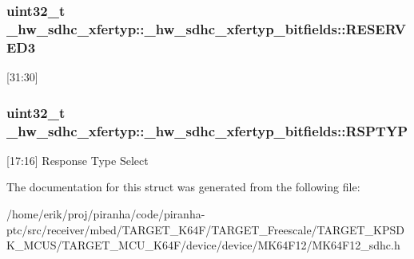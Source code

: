 \subsubsection[{\texorpdfstring{R\+E\+S\+E\+R\+V\+E\+D3}{RESERVED3}}]{\setlength{\rightskip}{0pt plus 5cm}uint32\+\_\+t \+\_\+hw\+\_\+sdhc\+\_\+xfertyp\+::\+\_\+hw\+\_\+sdhc\+\_\+xfertyp\+\_\+bitfields\+::\+R\+E\+S\+E\+R\+V\+E\+D3}\hypertarget{struct__hw__sdhc__xfertyp_1_1__hw__sdhc__xfertyp__bitfields_a9c79d5bbc854bc79d78b4d18a1568bda}{}\label{struct__hw__sdhc__xfertyp_1_1__hw__sdhc__xfertyp__bitfields_a9c79d5bbc854bc79d78b4d18a1568bda}
\mbox{[}31\+:30\mbox{]} 
\subsubsection[{\texorpdfstring{R\+S\+P\+T\+YP}{RSPTYP}}]{\setlength{\rightskip}{0pt plus 5cm}uint32\+\_\+t \+\_\+hw\+\_\+sdhc\+\_\+xfertyp\+::\+\_\+hw\+\_\+sdhc\+\_\+xfertyp\+\_\+bitfields\+::\+R\+S\+P\+T\+YP}\hypertarget{struct__hw__sdhc__xfertyp_1_1__hw__sdhc__xfertyp__bitfields_a5a9a23aebe33f6606b6b85f3a209b194}{}\label{struct__hw__sdhc__xfertyp_1_1__hw__sdhc__xfertyp__bitfields_a5a9a23aebe33f6606b6b85f3a209b194}
\mbox{[}17\+:16\mbox{]} Response Type Select 

The documentation for this struct was generated from the following file\+:\begin{DoxyCompactItemize}
\item 
/home/erik/proj/piranha/code/piranha-\/ptc/src/receiver/mbed/\+T\+A\+R\+G\+E\+T\+\_\+\+K64\+F/\+T\+A\+R\+G\+E\+T\+\_\+\+Freescale/\+T\+A\+R\+G\+E\+T\+\_\+\+K\+P\+S\+D\+K\+\_\+\+M\+C\+U\+S/\+T\+A\+R\+G\+E\+T\+\_\+\+M\+C\+U\+\_\+\+K64\+F/device/device/\+M\+K64\+F12/M\+K64\+F12\+\_\+sdhc.\+h\end{DoxyCompactItemize}

